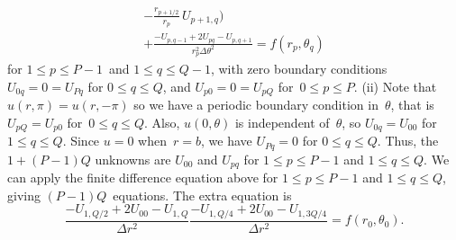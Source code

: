 \begin{Exercises}
\begin{ans}
\begin{multline*}
        -\frac{r_{p+1/2}}{r_p}\,U_{p+1,q}\biggr)\\
        +\frac{-U_{p,q-1}+2U_{pq}-U_{p,q+1}}{r_p^2\Delta\theta^2}
        =f(r_p,\theta_q)
\end{multline*}
for $1\le p\le P-1$~and $1\le q\le Q-1$, with zero boundary conditions
$U_{0q}=0=U_{Pq}$ for $0\le q\le Q$, and $U_{p0}=0=U_{pQ}$
for~$0\le p\le P$.\quad
(ii) Note that $u(r,\pi)=u(r,-\pi)$ so we have a periodic
boundary condition in~$\theta$, that is $U_{pQ}=U_{p0}$
for~$0\le q\le Q$.  Also, $u(0,\theta)$ is independent of~$\theta$,
so $U_{0q}=U_{00}$ for $1\le q\le Q$.  Since $u=0$ when~$r=b$, we have
$U_{Pq}=0$ for $0\le q\le Q$.  Thus, the $1+(P-1)Q$ unknowns are
$U_{00}$ and $U_{pq}$ for $1\le p\le P-1$ and $1\le q\le Q$.  We can
apply the finite difference equation above
for $1\le p\le P-1$ and $1\le q\le Q$, giving $(P-1)Q$~equations.
The extra equation is
\[
\frac{-U_{1,Q/2}+2U_{00}-U_{1,Q}}{\Delta r^2}
\frac{-U_{1,Q/4}+2U_{00}-U_{1,3Q/4}}{\Delta r^2}=f(r_0,\theta_0).
\]
\end{ans}

\end{Exercises}
